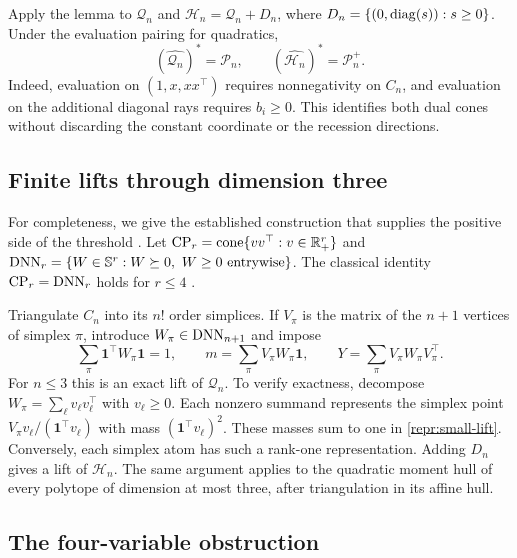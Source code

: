 Apply the lemma to $\mathcal Q_n$ and $\mathcal H_n=\mathcal Q_n+D_n$, where
$D_n=\{(0,\operatorname{diag}(s)):s\geq0\}$. Under the evaluation pairing for quadratics,
\begin{equation}\label{repr:duals}
 (\widehat{\mathcal Q_n})^*=\mathcal P_n,
 \qquad
 (\widehat{\mathcal H_n})^*=\mathcal P_n^+.
\end{equation}
Indeed, evaluation on $(1,x,xx^\top)$ requires nonnegativity on $C_n$, and
evaluation on the additional diagonal rays requires $b_i\geq0$.
This identifies both dual cones without discarding the constant coordinate
or the recession directions.

\subsection{Finite lifts through dimension three}

For completeness, we give the established construction that supplies the
positive side of the threshold \citep{AnstreicherBurer2010}. Let
$\operatorname{CP}_r=\operatorname{cone}\{vv^\top:v\in\mathbb R_+^r\}$ and
$\operatorname{DNN}_r=\{W\in\mathbb S^{r}:W\succeq0,\ W\geq0\text{ entrywise}\}$.
The classical identity $\operatorname{CP}_r=\operatorname{DNN}_r$ holds for $r\leq4$
\citep{Diananda1962,MaxfieldMinc1962}.

Triangulate $C_n$ into its $n!$ order simplices. If $V_\pi$ is the matrix
of the $n+1$ vertices of simplex $\pi$, introduce
$W_\pi\in\operatorname{DNN}_{n+1}$ and impose
\begin{equation}\label{repr:small-lift}
 \sum_\pi \mathbf1^\top W_\pi\mathbf1=1,
 \qquad m=\sum_\pi V_\pi W_\pi\mathbf1,
 \qquad Y=\sum_\pi V_\pi W_\pi V_\pi^\top.
\end{equation}
For $n\leq3$ this is an exact lift of $\mathcal Q_n$.
To verify exactness, decompose
$W_\pi=\sum_\ell v_\ell v_\ell^\top$ with $v_\ell\geq0$.
Each nonzero summand represents the simplex point
$V_\pi v_\ell/(\mathbf1^\top v_\ell)$ with mass
$(\mathbf1^\top v_\ell)^2$. These masses sum to one in
\eqref{repr:small-lift}. Conversely, each simplex atom has such a rank-one
representation. Adding $D_n$ gives a lift of $\mathcal H_n$.
The same argument applies to the quadratic moment hull of every polytope of
dimension at most three, after triangulation in its affine hull.

\subsection{The four-variable obstruction}

